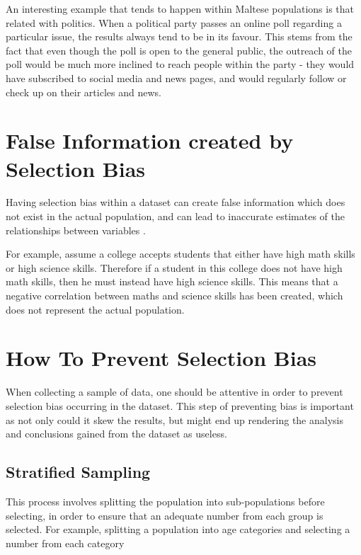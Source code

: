     
    An interesting example that tends to happen within Maltese populations is that related with politics. When a political party passes an online poll regarding a particular issue, the results always tend to be in its favour. This stems from the fact that even though the poll is open to the general public, the outreach of the poll would be much more inclined to reach people within the party - they would have subscribed to social media and news pages, and would regularly follow or check up on their articles and news.
    
    \section{False Information created by Selection Bias}
    
	Having selection bias within a dataset can create false information which does not exist in the actual population, and can lead to inaccurate estimates of the relationships between variables \citep{CuddebackEtAl2004}.
	
	For example, assume a college accepts students that either have high math skills or high science skills. Therefore if a student in this college does not have high math skills, then he must instead have high science skills. This means that a negative correlation between maths and science skills has been created, which does not represent the actual population.
	
	
	\section{How To Prevent Selection Bias}
	
	When collecting a sample of data, one should be attentive in order to prevent selection bias occurring in the dataset. This step of preventing bias is important as not only could it skew the results, but might end up rendering the analysis and conclusions gained from the dataset as useless.
	
	\subsection{Stratified Sampling}
	
	This process involves splitting the population into sub-populations before selecting, in order to ensure that an adequate number from each group is selected. For example, splitting a population into age categories and selecting a number from each category \citep{KrautenbacherEtAl2017}
	
